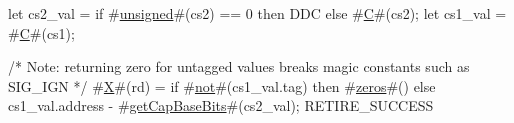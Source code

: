 let cs2_val = if #\hyperref[sailRISCVzunsigned]{unsigned}#(cs2) == 0 then DDC else #\hyperref[sailRISCVzC]{C}#(cs2);
let cs1_val = #\hyperref[sailRISCVzC]{C}#(cs1);

/* Note: returning zero for untagged values breaks magic constants such as SIG_IGN */
#\hyperref[sailRISCVzX]{X}#(rd) = if #\hyperref[sailRISCVznot]{not}#(cs1_val.tag) then
          #\hyperref[sailRISCVzzzeros]{zeros}#()
        else
          cs1_val.address - #\hyperref[sailRISCVzgetCapBaseBits]{getCapBaseBits}#(cs2_val);
RETIRE_SUCCESS
